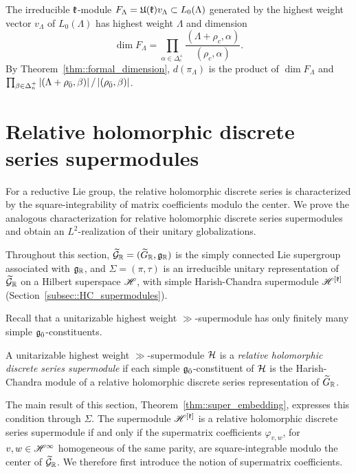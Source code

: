 \begin{remark}
The irreducible ${\mathfrak k}$-module $F_{\Lambda}={\mathfrak U}({\mathfrak k})v_{\Lambda}\subset L_{0}(\Lambda)$ generated by the highest weight vector $v_{\Lambda}$ of $L_0(\Lambda)$ has highest weight $\Lambda$ and dimension
\begin{equation*}
\dim F_{\Lambda} = \prod_{\alpha\in\Delta_c^+}
\frac{(\Lambda+\rho_c,\alpha)}{(\rho_c,\alpha)}.\end{equation*}
By Theorem~\ref{thm::formal_dimension}, $d(\pi_{\Lambda})$ is the product of $\dim F_{\Lambda}$ and
$\prod_{\beta\in\Delta_n^+}\left|{(\Lambda+\rho_{\bar0},\beta)}\right|/\left|{(\rho_{\bar0},\beta)}\right|$.
\end{remark}


\section{Relative holomorphic discrete series supermodules}\label{sec::relative_HDS_supermodules}
\noindent
For a reductive Lie group, the relative holomorphic discrete series is characterized by the square-integrability of matrix coefficients modulo the center. We prove the analogous characterization for relative holomorphic discrete series supermodules and obtain an $L^2$-realization of their unitary globalizations.

Throughout this section, $\widetilde{{\mathcal{G}}}_{{\mathbb R}}=(\widetilde{G}_{{\mathbb R}},{\mathfrak{g}}_{{\mathbb R}})$ is the simply connected Lie supergroup associated with ${\mathfrak{g}}_{{\mathbb R}}$, and $\Sigma=(\pi,\tau)$ is an irreducible unitary representation of $\widetilde{{\mathcal{G}}}_{{\mathbb R}}$ on a Hilbert superspace ${\mathscr{H}}$, with simple Harish-Chandra supermodule ${\mathscr{H}}^{[{\mathfrak k}]}$ (Section~\ref{subsec::HC_supermodules}).

Recall that a unitarizable highest weight $\gg$-supermodule has only finitely many simple ${\mathfrak{g}_{\bar{0}}}$-constituents.


\begin{definition}
A unitarizable highest weight $\gg$-supermodule ${\mathcal{H}}$ is a \emph{relative holomorphic discrete series supermodule} if each simple ${\mathfrak{g}_{\bar{0}}}$-constituent of ${\mathcal{H}}$ is the Harish-Chandra module of a relative holomorphic discrete series representation of $\widetilde{G}_{{\mathbb R}}$.
\end{definition}

The main result of this section, Theorem~\ref{thm::super_embedding}, expresses this condition through $\Sigma$. The supermodule ${\mathscr{H}}^{[{\mathfrak k}]}$ is a relative holomorphic discrete series supermodule if and only if the supermatrix coefficients $\varphi_{v,w}$, for $v,w\in{\mathscr{H}}^\infty$ homogeneous of the same parity, are square-integrable modulo the center of $\widetilde{{\mathcal{G}}}_{{\mathbb R}}$. 
We therefore first introduce the notion of supermatrix coefficients.

